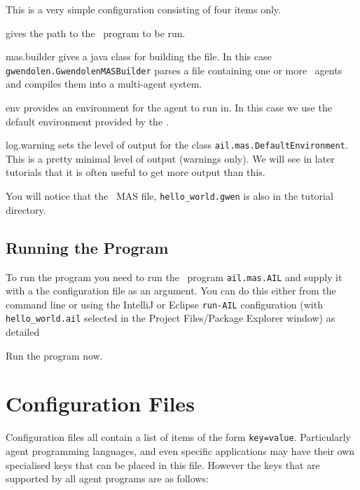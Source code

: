 This is a very simple configuration consisting of four items only.
\begin{description}
\item[mas.file] gives the path to the \gwendolen\ program to be run.
\begin{sloppypar}
\item[mas.builder] gives a java class for building the file.  In this case \texttt{gwendolen.GwendolenMASBuilder} parses a file containing one or more \gwendolen\ agents and compiles them into a multi-agent system.
\item[env] provides an environment for the agent to run in.  In this case we use the default environment provided by the \ail.
\item[log.warning] sets the level of output for the class \texttt{ail.mas.DefaultEnvironment}.  This is a pretty minimal level of output (warnings only).  We will see in later tutorials that it is often useful to get more output than this.
\end{sloppypar}
\end{description}
You will notice that the \gwendolen\ MAS file, \texttt{hello\_world.gwen} is also in the tutorial directory.

\subsection{Running the Program}

To run the program you need to run the \java\ program \texttt{ail.mas.AIL} and supply it with a the configuration file as an argument.  You can do this either from the command line or using the IntelliJ or Eclipse \texttt{run-AIL} configuration (with \texttt{hello\_world.ail} selected in the Project Files/Package Explorer window) as detailed 

Run the program now.

\section{Configuration Files}

Configuration files all contain a list of items of the form \texttt{key=value}.  Particularly agent programming languages, and even specific applications may have their own specialised keys that can be placed in this file.  However the keys that are supported by all agent programs are as follows:

